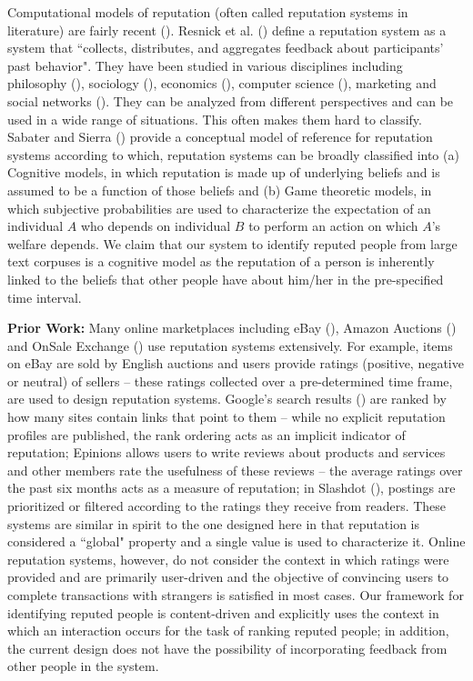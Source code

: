 \documentclass[a4paper,man,natbib]{apa6}
\begin{document}
Computational models of reputation (often called reputation systems in literature) are fairly recent (\cite{Sabater_05,Resnick_02}). Resnick et al. (\cite{Resnick_02}) define a reputation system as a system that ``collects, distributes, and aggregates feedback about participants' past behavior". They have been studied in various disciplines including philosophy (\cite{Hume_75}), sociology (\cite{Wasserman_94}), economics (\cite{Milgrom_82}), computer science (\cite{Kamvar_03a}), marketing and social networks (\cite{Dellarocas_03}). They can be analyzed from different perspectives and can be used in a wide range of situations. This often makes them hard to classify. Sabater and Sierra  (\cite{Sabater_05}) provide a conceptual model of reference for reputation systems according to which, reputation systems can be broadly classified into (a) Cognitive models, in which reputation is made up of underlying beliefs and is assumed to be a function of those beliefs and (b) Game theoretic models, in which subjective probabilities are used to characterize the expectation of an individual $A$ who depends on individual $B$ to perform an action on which $A$'s welfare depends. We claim that our system to identify reputed people from large text corpuses is a cognitive model as the reputation of a person is inherently linked to the beliefs that other people have about him/her in the pre-specified time interval. 

\noindent \textbf{Prior Work: } Many online marketplaces including eBay (\cite{eBay_02}), Amazon Auctions (\cite{AA}) and OnSale Exchange (\cite{OnSale}) use reputation systems extensively. For example, items on eBay are sold by English auctions and users provide ratings (positive, negative or neutral) of sellers -- these ratings collected over a pre-determined time frame, are used to design reputation systems. Google's  search results (\cite{Brin_98a}) are ranked by how many sites contain links that point to them -- while no explicit reputation
profiles are published, the rank ordering acts as an implicit indicator of reputation; Epinions allows users to write reviews about products and services and other members rate the usefulness of these reviews -- the average ratings over the past six months acts as a measure of reputation; in Slashdot (\cite{Slashdot}), postings are prioritized or filtered according to the ratings they receive from readers. These systems are similar in spirit to the one designed here in that reputation is considered a ``global" property and a single value is used to characterize it. Online reputation systems, however, do not consider the context in which ratings were provided and are primarily user-driven and the objective of convincing users to complete transactions with strangers is satisfied in most cases. Our framework for identifying reputed people is content-driven and explicitly uses the context in which an interaction occurs for the task of ranking reputed people; in addition, the current design does not have the possibility of incorporating feedback from other people in the system. 
\end{document}

